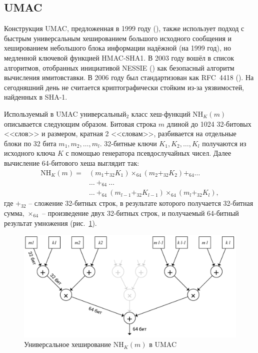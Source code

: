 \subsection{UMAC}\label{sec:umac}

Конструкция UMAC, предложенная в 1999 году (\cite{Black:Halevi:Krawczyk:etc:1999}), также использует подход с быстрым универсальным хешированием большого исходного сообщения и хешированием небольшого блока информации надёжной (на 1999 год), но медленной ключевой функцией HMAC-SHA1. В 2003 году вошёл в список алгоритмов, отобранных инициативой NESSIE () как безопасный алгоритм вычисления имитовставки. В 2006 году был стандартизован как RFC~4418 (\cite{rfc4418}). На сегодняшний день не считается криптографически стойким из-за уязвимостей, найденных в SHA-1.

Используемый в UMAC универсальный$_2$ класс хеш-функций $\textrm{NH}_K (m)$ описывается следующим образом. Битовая строка $m$ длиной до 1024 32-битовых <<слов>> и размером, кратная 2 <<словам>>, разбивается на отдельные блоки по 32 бита $m_1, m_2, \dots, m_l$. 32-битные ключи $K_1, K_2, \dots, K_l$ получаются из исходного ключа $K$ с помощью генератора псевдослучайных чисел. Далее вычисление 64-битового хеша выглядит так: \[\begin{array}{ll}
    \textrm{NH}_K (m) = & ( m_1 +_{32}K_1) \times_{64} (m_2 +_{32} K_2) +_{64} \dots \\
                        & \dots ~ +_{64} ~ \dots \\
                        & \dots ~ +_{64} ~ (m_{l-1} +_{32} K_{l-1}) \times_{64} (m_l+_{32}K_l),
\end{array} \] где $+_{32}$ -- сложение 32-битных строк, в результате которого получается 32-битная сумма, $\times_{64}$ -- произведение двух 32-битных строк, и получаемый 64-битный результат умножения (рис.~\ref{fig:UMAC}).

\begin{figure}
    \centering
    \includegraphics[width=1\textwidth]{pic/UMAC}
    \caption{Универсальное хеширование $\textrm{NH}_K (m)$ в UMAC}
    \label{fig:UMAC}
\end{figure}

